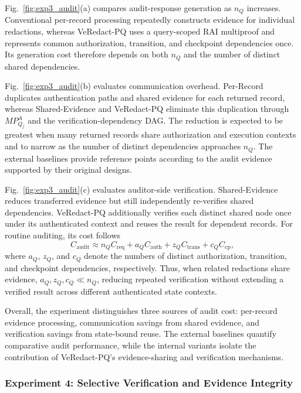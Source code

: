 \documentclass[lettersize,journal]{IEEEtran}
\begin{document}
Fig.~\ref{fig:exp3_audit}(a) compares audit-response generation as
$n_Q$ increases. Conventional per-record processing repeatedly
constructs evidence for individual redactions, whereas VeRedact-PQ
uses a query-scoped RAI multiproof and represents common authorization,
transition, and checkpoint dependencies once. Its generation cost
therefore depends on both $n_Q$ and the number of distinct shared
dependencies.

Fig.~\ref{fig:exp3_audit}(b) evaluates communication overhead.
Per-Record duplicates authentication paths and shared evidence for
each returned record, whereas Shared-Evidence and VeRedact-PQ eliminate
this duplication through $MP_{Q_j}^A$ and the verification-dependency
DAG. The reduction is expected to be greatest when many returned
records share authorization and execution contexts and to narrow as
the number of distinct dependencies approaches $n_Q$. The external
baselines provide reference points according to the audit evidence
supported by their original designs.

Fig.~\ref{fig:exp3_audit}(c) evaluates auditor-side verification.
Shared-Evidence reduces transferred evidence but still independently
re-verifies shared dependencies. VeRedact-PQ additionally verifies each
distinct shared node once under its authenticated context and reuses
the result for dependent records. For routine auditing, its cost follows
\begin{equation}
C_{\mathrm{audit}}
\approx
n_QC_{\mathrm{req}}
+a_QC_{\mathrm{auth}}
+z_QC_{\mathrm{trans}}
+c_QC_{\mathrm{cp}},
\end{equation}
where $a_Q$, $z_Q$, and $c_Q$ denote the numbers of distinct
authorization, transition, and checkpoint dependencies, respectively.
Thus, when related redactions share evidence,
$a_Q,z_Q,c_Q\ll n_Q$, reducing repeated verification without extending
a verified result across different authenticated state contexts.

Overall, the experiment distinguishes three sources of audit cost:
per-record evidence processing, communication savings from shared
evidence, and verification savings from state-bound reuse. The external
baselines quantify comparative audit performance, while the internal
variants isolate the contribution of VeRedact-PQ's evidence-sharing and
verification mechanisms.
    
 \subsubsection*{\textbf{Experiment 4: Selective Verification and Evidence Integrity}}
\end{document}
